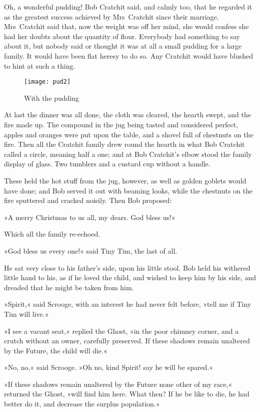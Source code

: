 Oh, a wonderful pudding! Bob Cratchit said, and calmly too, that he regarded it as the greatest success achieved by Mrs~Cratchit since their marriage. Mrs~Cratchit said that, now the weight was off her mind, she would confess she had her doubts about the quantity of flour. Everybody had something to say about it, but nobody said or thought it was at all a small pudding for a large family. It would have been flat heresy to do so. Any Cratchit would have blushed to hint at such a thing.

\begin{figure}
\centering
\texttt{[image: pud2]}
\caption{With the pudding}
\end{figure}


At last the dinner was all done, the cloth was cleared, the hearth swept, and the fire made up. The compound in the jug being tasted and considered perfect, apples and oranges were put upon the table, and a shovel full of chestnuts on the fire. Then all the Cratchit family drew round the hearth in what Bob Cratchit called a circle, meaning half a one; and at Bob Cratchit's elbow stood the family display of glass. Two tumblers and a custard cup without a handle.

These held the hot stuff from the jug, however, as well as golden goblets would have done; and Bob served it out with beaming looks, while the chestnuts on the fire sputtered and cracked noisily. Then Bob proposed:

»A merry Christmas to us all, my dears. God bless us!«

Which all the family re-echoed.

»God bless us every one!« said Tiny Tim, the last of all.

He sat very close to his father's side, upon his little stool. Bob held his withered little hand to his, as if he loved the child, and wished to keep him by his side, and dreaded that he might be taken from him.

»Spirit,« said Scrooge, with an interest he had never felt before, »tell me if Tiny Tim will live.«

»I see a vacant seat,« replied the Ghost, »in the poor chimney corner, and a crutch without an owner, carefully preserved. If these shadows remain unaltered by the Future, the child will die.«

»No, no,« said Scrooge. »Oh no, kind Spirit! say he will be spared.«

»If these shadows remain unaltered by the Future none other of my race,« returned the Ghost, »will find him here. What then? If he be like to die, he had better do it, and decrease the surplus population.«

